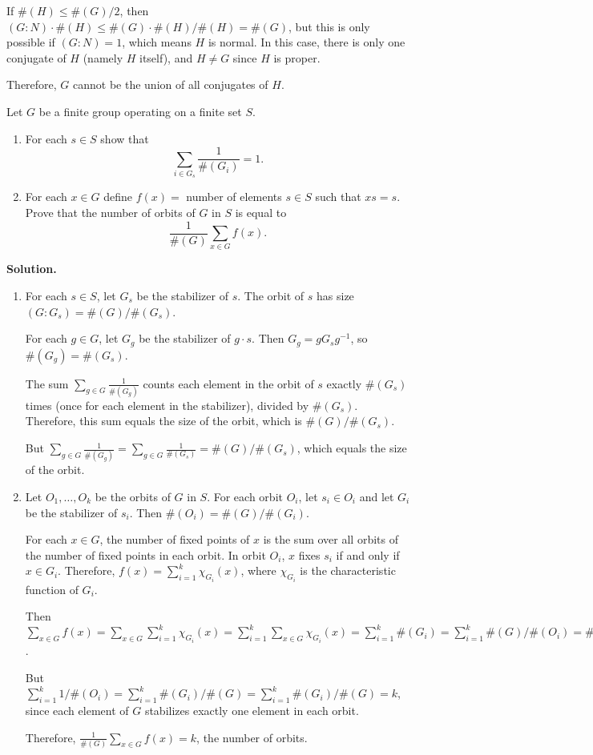 If $\#(H) \leq \#(G)/2$, then $(G : N) \cdot \#(H) \leq \#(G) \cdot \#(H)/\#(H) = \#(G)$, but this is only possible if $(G : N) = 1$, which means $H$ is normal. In this case, there is only one conjugate of $H$ (namely $H$ itself), and $H \neq G$ since $H$ is proper.

Therefore, $G$ cannot be the union of all conjugates of $H$.

\begin{problembox}
Let $G$ be a finite group operating on a finite set $S$.
\begin{enumerate}[label=(\alph*)]
\item For each $s \in S$ show that 
\[\sum_{i \in G_s} \frac{1}{\#(G_i)} = 1.\]
\item For each $x \in G$ define $f(x) = $ number of elements $s \in S$ such that $xs = s$. Prove that the number of orbits of $G$ in $S$ is equal to 
\[\frac{1}{\#(G)} \sum_{x \in G} f(x).\]
\end{enumerate}
\end{problembox}

\noindent\textbf{Solution.}
\begin{enumerate}[label=(\alph*)]
\item For each $s \in S$, let $G_s$ be the stabilizer of $s$. The orbit of $s$ has size $(G : G_s) = \#(G)/\#(G_s)$. 

For each $g \in G$, let $G_g$ be the stabilizer of $g \cdot s$. Then $G_g = gG_sg^{-1}$, so $\#(G_g) = \#(G_s)$. 

The sum $\sum_{g \in G} \frac{1}{\#(G_g)}$ counts each element in the orbit of $s$ exactly $\#(G_s)$ times (once for each element in the stabilizer), divided by $\#(G_s)$. Therefore, this sum equals the size of the orbit, which is $\#(G)/\#(G_s)$.

But $\sum_{g \in G} \frac{1}{\#(G_g)} = \sum_{g \in G} \frac{1}{\#(G_s)} = \#(G)/\#(G_s)$, which equals the size of the orbit.

\item Let $O_1, \ldots, O_k$ be the orbits of $G$ in $S$. For each orbit $O_i$, let $s_i \in O_i$ and let $G_i$ be the stabilizer of $s_i$. Then $\#(O_i) = \#(G)/\#(G_i)$.

For each $x \in G$, the number of fixed points of $x$ is the sum over all orbits of the number of fixed points in each orbit. In orbit $O_i$, $x$ fixes $s_i$ if and only if $x \in G_i$. Therefore, $f(x) = \sum_{i=1}^k \chi_{G_i}(x)$, where $\chi_{G_i}$ is the characteristic function of $G_i$.

Then $\sum_{x \in G} f(x) = \sum_{x \in G} \sum_{i=1}^k \chi_{G_i}(x) = \sum_{i=1}^k \sum_{x \in G} \chi_{G_i}(x) = \sum_{i=1}^k \#(G_i) = \sum_{i=1}^k \#(G)/\#(O_i) = \#(G) \sum_{i=1}^k 1/\#(O_i)$.

But $\sum_{i=1}^k 1/\#(O_i) = \sum_{i=1}^k \#(G_i)/\#(G) = \sum_{i=1}^k \#(G_i)/\#(G) = k$, since each element of $G$ stabilizes exactly one element in each orbit.

Therefore, $\frac{1}{\#(G)} \sum_{x \in G} f(x) = k$, the number of orbits.
\end{enumerate}

